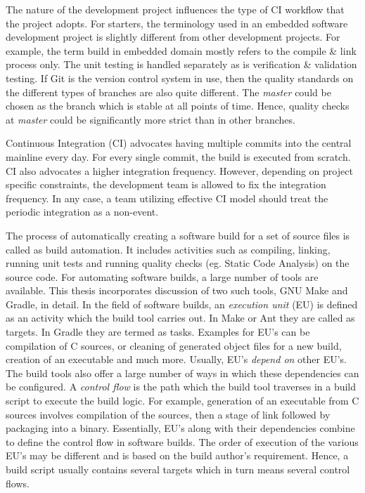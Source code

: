 \documentclass[12pt, a4paper, titlepage]{scrartcl}
\newcommand{\courierword}[1]{\textsf{\itshape #1}}{\fontfamily{pcr}\selectfont}%
\begin{document}
\par The nature of the development project influences the type of CI workflow that the project adopts. For starters, the terminology used in an embedded software development project is slightly different from other development projects. For example, the term build in embedded domain mostly refers to the compile \& link process only. The unit testing is handled separately as is verification \& validation testing. If Git is the version control system in use, then the quality standards on the different types of branches are also quite different. The \courierword{master} could be chosen as the branch which is stable at all points of time. Hence, quality checks at \courierword{master} could be significantly more strict than in other branches. 
\par Continuous Integration (CI) advocates having multiple commits into the central mainline every day. For every single commit, the build is executed from scratch. CI also advocates a higher integration frequency. However, depending on project specific constraints, the development team is allowed to fix the integration frequency. In any case, a team utilizing effective CI model should treat the periodic integration as a non-event\cite{fowler2006continuous}.  
\par The process of automatically creating a software build for a set of source files is called as build automation. It includes activities such as compiling, linking, running unit tests and running quality checks (eg. Static Code Analysis) on the source code. For automating software builds, a large number of tools are available. This thesis incorporates discussion of two such tools, GNU Make\cite{GNUMakeManual} and Gradle\cite{dockter2015gradle}, in detail. In the field of software builds, an \emph{execution unit} (EU) is defined as an activity which the build tool carries out. In Make or Ant they are called as targets. In Gradle they are termed as tasks. Examples for EU's can be compilation of C sources, or cleaning of generated object files for a new build, creation of an executable and much more. Usually, EU's \textit{depend on} other EU's. The build tools also offer a large number of ways in which these dependencies can be configured. A \emph{control flow} is the path which the build tool traverses in a build script to execute the build logic. For example, generation of an executable from C sources involves compilation of the sources, then a stage of link followed by packaging into a binary. Essentially, EU's along with their dependencies combine to define the control flow in software builds. The order of execution of the various EU's may be different and is based on the build author's requirement. Hence, a build script usually contains several targets which in turn means several control flows.  
\end{document}
